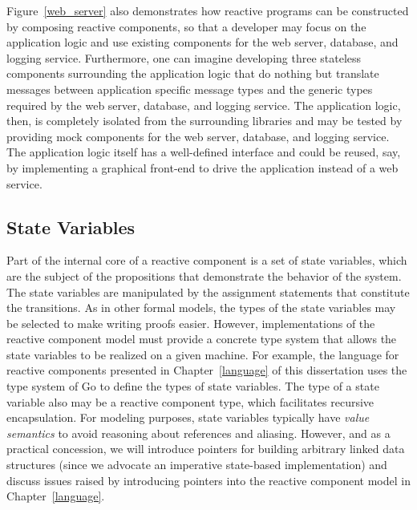 Figure~\ref{web_server} also demonstrates how reactive programs can be constructed by composing reactive components, so that a developer may focus on the application logic and use existing components for the web server, database, and logging service.
Furthermore, one can imagine developing three stateless components surrounding the application logic that do nothing but translate messages between application specific message types and the generic types required by the web server, database, and logging service.
The application logic, then, is completely isolated from the surrounding libraries and may be tested by providing mock components for the web server, database, and logging service.
The application logic itself has a well-defined interface and could be reused, say, by implementing a graphical front-end to drive the application instead of a web service.

\subsection{State Variables}
Part of the internal core of a reactive component is a set of state variables, which are the subject of the propositions that demonstrate the behavior of the system.
The state variables are manipulated by the assignment statements that constitute the transitions.
As in other formal models, the types of the state variables may be selected to make writing proofs easier.
However, implementations of the reactive component model must provide a concrete type system that allows the state variables to be realized on a given machine.
For example, the \rcgo{} language for reactive components presented in Chapter~\ref{language} of this dissertation uses the type system of Go to define the types of state variables.
The type of a state variable also may be a reactive component type, which facilitates recursive encapsulation.
For modeling purposes, state variables typically have \emph{value semantics} to avoid reasoning about references and aliasing.
However, and as a practical concession, we will introduce pointers for building arbitrary linked data structures (since we advocate an imperative state-based implementation) and discuss issues raised by introducing pointers into the reactive component model in Chapter~\ref{language}.


